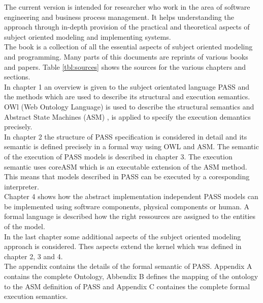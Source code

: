 The current version is intended for researcher who work in the area of software engineering and business process management. It helps understanding the approach through in-depth provision of the practical and theoretical aspects of subject oriented modeling and implementing systems.\\
The book is a collection of all the essential aspects of subject oriented modeling and programming. Many parts of this documents are reprints of various books and papers. Table \ref{tbl:sources} shows the sources for the various chapters and sections.\\
In chapter 1 an overview is given to the subject orientated language PASS and the methods which are used to describe its structural and execution semantics. OWl (Web Ontology Language) \cite{Web:OWL} is used to describe the structural semantics and Abstract State Machines (ASM) \cite{book:ASM-2018}, \cite{book:ASM-2003} is applied to specify the execution demantics precisely.\\
In chapter 2 the structure of PASS specification is considered in detail and its semantic is defined precisely in a formal way using OWL and ASM. The semantic of the execution of PASS models is described in chapter 3. The execution semantic uses coreASM which is an executable extension of the ASM method. This means that models described in PASS can be executed by a coresponding interpreter.\\
Chapter 4 shows how the abstract implementation independent PASS models can be implemented using software components, physical components or human.  A formal language is described how the right ressources are assigned to the entities of the model.\\
In the last chapter some additional aspects of the subject oriented modeling approach is considered. Thes aspects extend the kernel which was defined in chapter 2, 3 and 4.\\
The appendix contains the details of the formal semantic of PASS. Appendix A contains the complete Ontology, Abbendix B defines the mapping of the ontology to the ASM definition of PASS and Appendix C containes the complete formal execution semantics.



